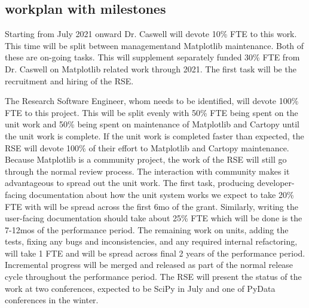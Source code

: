 \documentclass[12pt]{article}
\numberwithin{page}{section}
\begin{document}
\subsection{workplan with milestones}


Starting from July 2021 onward Dr. Caswell will devote 10\% FTE to
this work.  This time will be split between managementand Matplotlib
maintenance.  Both of these are on-going tasks.  This will supplement
separately funded 30\% FTE from Dr. Caswell on Matplotlib related work
through 2021.  The first task will be the recruitment and hiring of
the RSE.

The Research Software Engineer, whom needs to be identified, will
devote 100\% FTE to this project.  This will be split evenly with 50\%
FTE being spent on the unit work and 50\% being spent on maintenance
of Matplotlib and Cartopy until the unit work is complete.  If the
unit work is completed faster than expected, the RSE will devote 100\%
of their effort to Matplotlib and Cartopy maintenance.  Because
Matplotlib is a community project, the work of the RSE will still go
through the normal review process.  The interaction with community
makes it advantageous to spread out the unit work.  The first task,
producing developer-facing documentation about how the unit system
works we expect to take 20\% FTE with will be spread across the first
6mo of the grant.  Similarly, writing the user-facing documentation
should take about 25\% FTE which will be done is the 7-12mos of the
performance period.  The remaining work on units, adding the tests,
fixing any bugs and inconsistencies, and any required internal
refactoring, will take 1 FTE and will be spread across final 2 years
of the performance period.  Incremental progress will be merged and
released as part of the normal release cycle throughout the
performance period.  The RSE will present the status of the work at
two conferences, expected to be SciPy in July and one of PyData
conferences in the winter.
\end{document}
